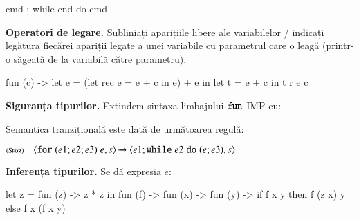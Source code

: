 \documentclass[addpoints,12pt,a4paper,answers]{exam}
\begin{document}
\begin{questions}
\begin{asciiml}
cmd ; while cnd do cmd
\end{asciiml}

\vspace{-1ex}\question[1] \textbf{Operatori de legare. } Subliniați aparițiile libere ale variabilelor / indicați legătura fiecărei apariții legate a unei variabile cu parametrul care o leagă (printr-o săgeată de la variabilă către parametru).

\begin{asciiml}
  fun (c) -> let e = (let rec e = e + c in e) + e in let t = e + c in t r e c
\end{asciiml}

\vspace{-1ex}\question[3] \textbf{Siguranța tipurilor. }
Extindem sintaxa limbajului $\mathrel{\text{\ttfamily fun}}$-IMP cu:
\vspace{-1ex}\begin{syntaxBlock}{}
\end{syntaxBlock}

\vspace{-4ex}Semantica tranzițională este dată de următoarea regulă:

$\reg[Sfor]{\Ss{\c{\Sfor (e1; e2; e3)\;e,s}}{\c{e1 ; \Swhile e2 \Sdo (e ; e3),s}}}{}{}$


\question[3\half] \textbf{Inferența tipurilor. }
Se dă expresia $e$:
\begin{asciiml}
let z = fun (z) -> z * z in
fun (f) -> fun (x) -> fun (y) ->
   if f x y then f (z x) y else f x (f x y)
\end{asciiml}
\end{questions}
\end{document}
